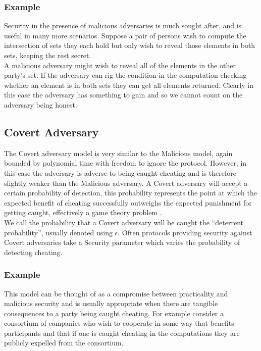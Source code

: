 \documentclass[ %
                    author={Nicholas Tutte},
                supervisor={Prof. Nigel Smart},
                    degree={MEng},
                     title={Secure Two Party Computation},
                  subtitle={A practical comparison of recent protocols},
                      type={Research - GG1K},
                      year={2015} ]{dissertation}
\begin{document}
				\subsubsection{Example}
					Security in the presence of malicious adversaries is much sought after, and is useful in many more scenarios. Suppose a pair of persons wish to compute the intersection of sets they each hold but only wish to reveal those elements in both sets, keeping the rest secret.\\

					A malicious adversary might wish to reveal all of the elements in the other party's set. If the adversary can rig the condition in the computation checking whether an element is in both sets they can get all elements returned. Clearly in this case the adversary has something to gain and so we cannot count on the adversary being honest.\\


			\subsection{Covert Adversary}
				The Covert adversary model is very similar to the Malicious model, again bounded by polynomial time with freedom to ignore the protocol. However, in this case the adversary is adverse to being caught cheating and is therefore slightly weaker than the Malicious adversary. A Covert adversary will accept a certain probability of detection, this probability represents the point at which the expected benefit of cheating successfully outweighs the expected punishment for getting caught, effectively a game theory problem \cite{WhenGameTheoryMetSMC}.\\

				We call the probability that a Covert adversary will be caught the ``deterrent probability'', usually denoted using $\epsilon$. Often protocols providing security against Covert adversaries take a Security parameter which varies the probability of detecting cheating.

				\subsubsection{Example} 

					{This model can be thought of as a compromise between practicality and malicious security and is usually appropriate when there are tangible consequences to a party being caught cheating. For example consider a consortium of companies who wish to cooperate in some way that benefits participants and that if one is caught cheating in the computations they are publicly expelled from the consortium.\\}
\end{document}
